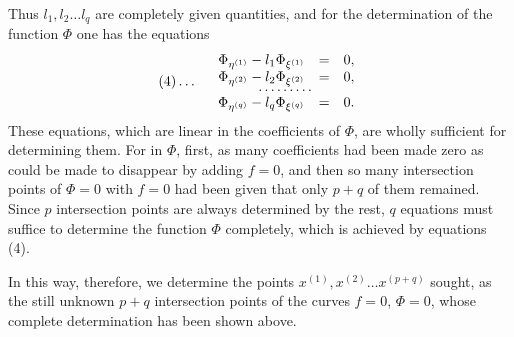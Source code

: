 \documentclass[10pt]{article}
\begin{document}
Thus \(l_1,l_2\ldots l_q\) are completely given quantities, and for the determination of the function \(\Phi\) one has the equations
\[
(4)\ldots\quad
\begin{array}{rcl}
\Phi_{\eta^{(1)}}-l_1\Phi_{\xi^{(1)}}&=&0,\\
\Phi_{\eta^{(2)}}-l_2\Phi_{\xi^{(2)}}&=&0,\\[-0.3em]
\multicolumn{3}{c}{\cdots\cdots\cdots}\\[-0.3em]
\Phi_{\eta^{(q)}}-l_q\Phi_{\xi^{(q)}}&=&0.
\end{array}
\]
These equations, which are linear in the coefficients of \(\Phi\), are wholly sufficient for determining them. For in \(\Phi\), first, as many coefficients had been made zero as could be made to disappear by adding \(f=0\), and then so many intersection points of \(\Phi=0\) with \(f=0\) had been given that only \(p+q\) of them remained. Since \(p\) intersection points are always determined by the rest, \(q\) equations must suffice to determine the function \(\Phi\) completely, which is achieved by equations (4).

In this way, therefore, we determine the points \(x^{(1)},x^{(2)}\ldots x^{(p+q)}\) sought, as the still unknown \(p+q\) intersection points of the curves \(f=0\), \(\Phi=0\), whose complete determination has been shown above.
\end{document}
